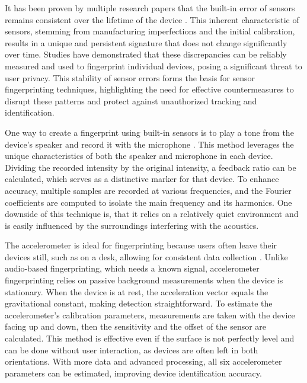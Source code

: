 \documentclass[11pt,
  oneside,openany,    %
]{scrreprt}
\begin{document}
It has been proven by multiple research papers that the built-in error of sensors remains consistent over the lifetime of the device \cite{DBLP:conf/sp/ZhangBS19, DBLP:conf/ndss/DeyRXCN14}. 
This inherent characteristic of sensors, stemming from manufacturing imperfections and the initial calibration, results in a unique and persistent signature that does not change significantly over time. 
Studies have demonstrated that these discrepancies can be reliably measured and used to fingerprint individual devices, posing a significant threat to user privacy. 
This stability of sensor errors forms the basis for sensor fingerprinting techniques, highlighting the need for effective countermeasures to disrupt these patterns and protect against unauthorized tracking and identification.

One way to create a fingerprint using built-in sensors is to play a tone from the device's speaker and record it with the microphone \cite{ das2014poster, DBLP:journals/comsur/BaldiniS17}.
This method leverages the unique characteristics of both the speaker and microphone in each device.
Dividing the recorded intensity by the original intensity, a feedback ratio can be calculated, which serves as a distinctive marker for that device.
To enhance accuracy, multiple samples are recorded at various frequencies, and the Fourier coefficients are computed to isolate the main frequency and its harmonics.
One downside of this technique is, that it relies on a relatively quiet environment and is easily influenced by the surroundings interfering with the acoustics.

The accelerometer is ideal for fingerprinting because users often leave their devices still, such as on a desk, allowing for consistent data collection \cite{DBLP:conf/ndss/DeyRXCN14, DBLP:conf/sp/ZhangBS19, DBLP:journals/comsur/BaldiniS17}.
Unlike audio-based fingerprinting, which needs a known signal, accelerometer fingerprinting relies on passive background measurements when the device is stationary.
When the device is at rest, the acceleration vector equals the gravitational constant, making detection straightforward.
To estimate the accelerometer's calibration parameters, measurements are taken with the device facing up and down, then the sensitivity and the offset of the sensor are calculated.
This method is effective even if the surface is not perfectly level and can be done without user interaction, as devices are often left in both orientations.
With more data and advanced processing, all six accelerometer parameters can be estimated, improving device identification accuracy.
\end{document}
